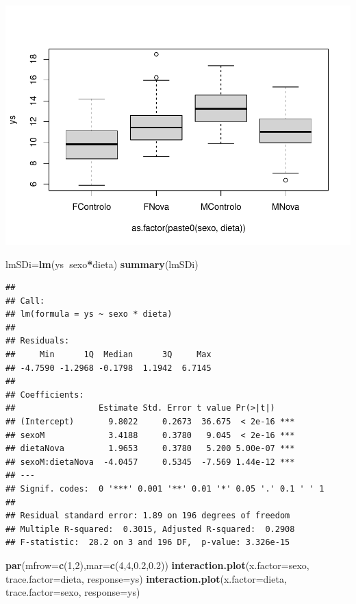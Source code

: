 \documentclass[
]{book}
\newenvironment{Shaded}{\begin{snugshade}}{\end{snugshade}}
\newcommand{\DataTypeTok}[1]{\textcolor[rgb]{0.13,0.29,0.53}{#1}}
\newcommand{\DecValTok}[1]{\textcolor[rgb]{0.00,0.00,0.81}{#1}}
\newcommand{\FloatTok}[1]{\textcolor[rgb]{0.00,0.00,0.81}{#1}}
\newcommand{\KeywordTok}[1]{\textcolor[rgb]{0.13,0.29,0.53}{\textbf{#1}}}
\newcommand{\NormalTok}[1]{#1}
\newcommand{\OperatorTok}[1]{\textcolor[rgb]{0.81,0.36,0.00}{\textbf{#1}}}
\begin{document}
\includegraphics{ECOMODbook_files/figure-latex/a11.1-1.pdf}

\begin{Shaded}
\begin{Highlighting}[]
\NormalTok{lmSDi=}\KeywordTok{lm}\NormalTok{(ys}\OperatorTok{~}\NormalTok{sexo}\OperatorTok{*}\NormalTok{dieta)}
\KeywordTok{summary}\NormalTok{(lmSDi)}
\end{Highlighting}
\end{Shaded}

\begin{verbatim}
## 
## Call:
## lm(formula = ys ~ sexo * dieta)
## 
## Residuals:
##     Min      1Q  Median      3Q     Max 
## -4.7590 -1.2968 -0.1798  1.1942  6.7145 
## 
## Coefficients:
##                 Estimate Std. Error t value Pr(>|t|)    
## (Intercept)       9.8022     0.2673  36.675  < 2e-16 ***
## sexoM             3.4188     0.3780   9.045  < 2e-16 ***
## dietaNova         1.9653     0.3780   5.200 5.00e-07 ***
## sexoM:dietaNova  -4.0457     0.5345  -7.569 1.44e-12 ***
## ---
## Signif. codes:  0 '***' 0.001 '**' 0.01 '*' 0.05 '.' 0.1 ' ' 1
## 
## Residual standard error: 1.89 on 196 degrees of freedom
## Multiple R-squared:  0.3015,	Adjusted R-squared:  0.2908 
## F-statistic:  28.2 on 3 and 196 DF,  p-value: 3.326e-15
\end{verbatim}

\begin{Shaded}
\begin{Highlighting}[]
\KeywordTok{par}\NormalTok{(}\DataTypeTok{mfrow=}\KeywordTok{c}\NormalTok{(}\DecValTok{1}\NormalTok{,}\DecValTok{2}\NormalTok{),}\DataTypeTok{mar=}\KeywordTok{c}\NormalTok{(}\DecValTok{4}\NormalTok{,}\DecValTok{4}\NormalTok{,}\FloatTok{0.2}\NormalTok{,}\FloatTok{0.2}\NormalTok{))}
\KeywordTok{interaction.plot}\NormalTok{(}\DataTypeTok{x.factor=}\NormalTok{sexo, }\DataTypeTok{trace.factor=}\NormalTok{dieta, }\DataTypeTok{response=}\NormalTok{ys)}
\KeywordTok{interaction.plot}\NormalTok{(}\DataTypeTok{x.factor=}\NormalTok{dieta, }\DataTypeTok{trace.factor=}\NormalTok{sexo, }\DataTypeTok{response=}\NormalTok{ys)}
\end{Highlighting}
\end{Shaded}
\end{document}

